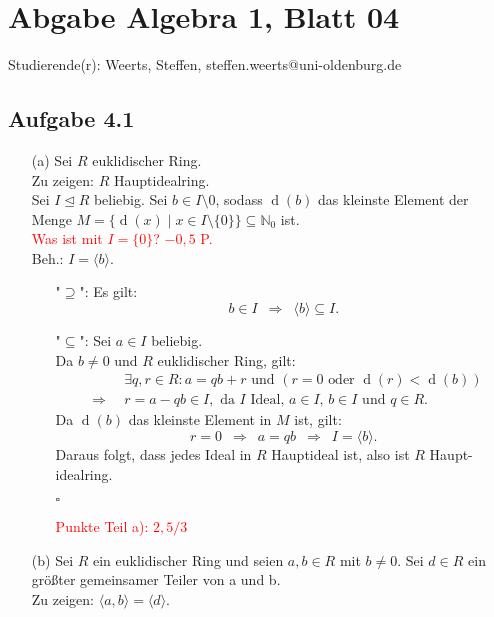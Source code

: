 \documentclass[12pt]{article}
\newcommand{\corr}[1]{\textcolor{red}{#1}}
\newcommand{\QED}{\begin{flushright} $\square$ \end{flushright}}
\newcommand{\df}{\enspace\Longrightarrow\enspace}
\newcommand{\isIdeal}{\trianglelefteq}
\newcommand{\ideal}[1]{\langle#1\rangle}
\newcommand{\enorm}{\operatorname{d}}
\begin{document}
\section*{Abgabe Algebra 1, Blatt 04}

Studierende(r): Weerts, Steffen, steffen.weerts@uni-oldenburg.de

\subsection*{Aufgabe 4.1}
\begin{enumerate}
	\item[(a)] Sei $R$ euklidischer Ring. \\
	Zu zeigen: $R$ Hauptidealring. \\
	Sei $I\isIdeal R$ beliebig. Sei $b\in I\setminus{0}$, sodass $\enorm(b)$ das kleinste Element der Menge $M=\{\enorm(x)\mid x\in I\setminus\{0\}\}\subseteq\mathbb{N}_0$ ist. \\
\corr{Was ist mit $I=\{0\}$? $-0,5$ P.}\\
	Beh.: $I=\ideal{b}$.
	\begin{enumerate}
		\item["$\supseteq$":] Es gilt: $$b\in I\df\ideal{b}\subseteq I.$$
		
		\item["$\subseteq$":] Sei $a\in I$ beliebig. \\
		Da $b\neq 0$ und $R$ euklidischer Ring, gilt:
		\begin{align*}
			&\exists q,r\in R: a=qb+r\text{ und }\left(r=0\text{ oder }\enorm(r)<\enorm(b)\right) \\
			\df &r=a-qb\in I,\text{ da $I$ Ideal, $a\in I$, $b\in I$ und $q\in R$}.
		\end{align*}
		Da $\enorm(b)$ das kleinste Element in $M$ ist, gilt: $$r=0\df a=qb\df I=\ideal{b}.$$
		Daraus folgt, dass jedes Ideal in $R$ Hauptideal ist, also ist $R$ Haupt- idealring.
		\QED
\corr{Punkte Teil a): $2,5/3$}
	\end{enumerate}
	
	\item[(b)] Sei $R$ ein euklidischer Ring und seien $a,b\in R$ mit $b\neq 0$. Sei $d\in R$ ein größter gemeinsamer Teiler von a und b. \\
	Zu zeigen: $\ideal{a,b}=\ideal{d}$.\\
	

\end{enumerate}
\end{document}
